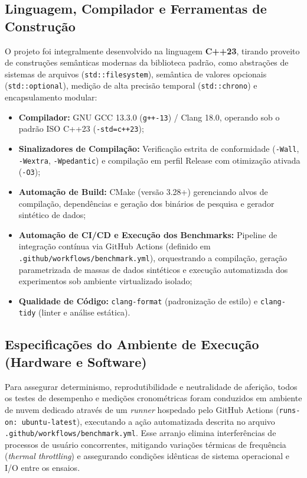 \documentclass[12pt,a4paper]{article}
\begin{document}
\subsection{Linguagem, Compilador e Ferramentas de Construção}
O projeto foi integralmente desenvolvido na linguagem \textbf{C++23}, tirando proveito de construções semânticas modernas da biblioteca padrão, como abstrações de sistemas de arquivos (\texttt{std::filesystem}), semântica de valores opcionais (\texttt{std::optional}), medição de alta precisão temporal (\texttt{std::chrono}) e encapsulamento modular:
\begin{itemize}
    \item \textbf{Compilador:} GNU GCC 13.3.0 (\texttt{g++-13}) / Clang 18.0, operando sob o padrão ISO C++23 (\texttt{-std=c++23});
    \item \textbf{Sinalizadores de Compilação:} Verificação estrita de conformidade (\texttt{-Wall}, \texttt{-Wextra}, \texttt{-Wpedantic}) e compilação em perfil Release com otimização ativada (\texttt{-O3});
    \item \textbf{Automação de Build:} CMake (versão 3.28+) gerenciando alvos de compilação, dependências e geração dos binários de pesquisa e gerador sintético de dados;
    \item \textbf{Automação de CI/CD e Execução dos Benchmarks:} Pipeline de integração contínua via GitHub Actions (definido em \texttt{.github/}\allowbreak\texttt{workflows/}\allowbreak\texttt{benchmark.yml}), orquestrando a compilação, geração parametrizada de massas de dados sintéticos e execução automatizada dos experimentos sob ambiente virtualizado isolado;
    \item \textbf{Qualidade de Código:} \texttt{clang-format} (padronização de estilo) e \texttt{clang-tidy} (linter e análise estática).
\end{itemize}

\subsection{Especificações do Ambiente de Execução (Hardware e Software)}
Para assegurar determinismo, reprodutibilidade e neutralidade de aferição, todos os testes de desempenho e medições cronométricas foram conduzidos em ambiente de nuvem dedicado através de um \textit{runner} hospedado pelo GitHub Actions (\texttt{runs-on: ubuntu-latest}), executando a ação automatizada descrita no arquivo \texttt{.github/}\allowbreak\texttt{workflows/}\allowbreak\texttt{benchmark.yml}. Esse arranjo elimina interferências de processos de usuário concorrentes, mitigando variações térmicas de frequência (\textit{thermal throttling}) e assegurando condições idênticas de sistema operacional e I/O entre os ensaios.
\end{document}
